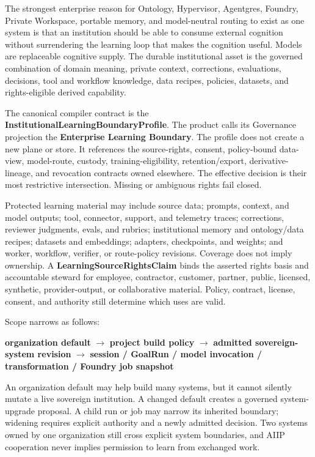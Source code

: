 \documentclass[
  11pt,
]{article}
\begin{document}
The strongest enterprise reason for Ontology, Hypervisor, Agentgres, Foundry,
Private Workspace, portable memory, and model-neutral routing to exist as one
system is that an institution should be able to consume external cognition
without surrendering the learning loop that makes the cognition useful. Models
are replaceable cognitive supply. The durable institutional asset is the
governed combination of domain meaning, private context, corrections,
evaluations, decisions, tool and workflow knowledge, data recipes, policies,
datasets, and rights-eligible derived capability.

The canonical compiler contract is the
\textbf{InstitutionalLearningBoundaryProfile}. The product calls its
Governance projection the \textbf{Enterprise Learning Boundary}. The profile
does not create a new plane or store. It references the source-rights, consent,
policy-bound data-view, model-route, custody, training-eligibility,
retention/export, derivative-lineage, and revocation contracts owned elsewhere.
The effective decision is their most restrictive intersection. Missing or
ambiguous rights fail closed.

Protected learning material may include source data; prompts, context, and
model outputs; tool, connector, support, and telemetry traces; corrections,
reviewer judgments, evals, and rubrics; institutional memory and ontology/data
recipes; datasets and embeddings; adapters, checkpoints, and weights; and
worker, workflow, verifier, or route-policy revisions. Coverage does not imply
ownership. A \textbf{LearningSourceRightsClaim} binds the asserted rights basis
and accountable steward for employee, contractor, customer, partner, public,
licensed, synthetic, provider-output, or collaborative material. Policy,
contract, license, consent, and authority still determine which uses are valid.

Scope narrows as follows:

\begin{center}
\textbf{organization default} $\rightarrow$ \textbf{project build policy}
$\rightarrow$ \textbf{admitted sovereign-system revision} $\rightarrow$
\textbf{session / GoalRun / model invocation / transformation / Foundry job snapshot}
\end{center}

An organization default may help build many systems, but it cannot silently
mutate a live sovereign institution. A changed default creates a governed
system-upgrade proposal. A child run or job may narrow its inherited boundary;
widening requires explicit authority and a newly admitted decision. Two systems
owned by one organization still cross explicit system boundaries, and AIIP
cooperation never implies permission to learn from exchanged work.
\end{document}
